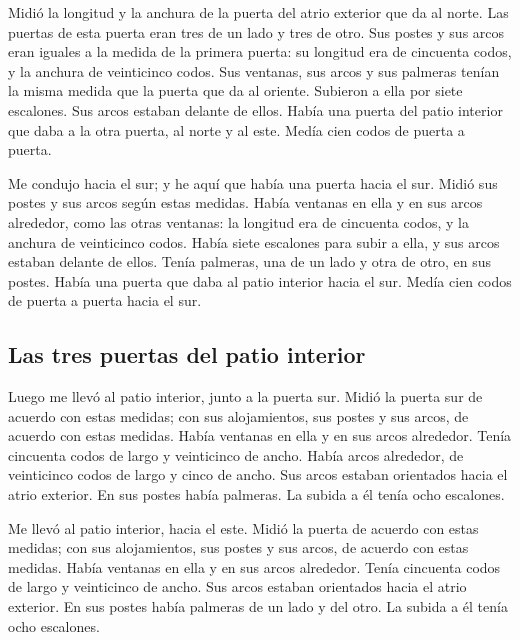  Midió la longitud y la anchura de la puerta del atrio
exterior que da al norte.  Las puertas de esta puerta
eran tres de un lado y tres de otro. Sus postes y sus arcos eran iguales
a la medida de la primera puerta: su longitud era de cincuenta codos, y
la anchura de veinticinco codos.  Sus ventanas, sus arcos
y sus palmeras tenían la misma medida que la puerta que da al oriente.
Subieron a ella por siete escalones. Sus arcos estaban delante de ellos.
 Había una puerta del patio interior que daba a la otra
puerta, al norte y al este. Medía cien codos de puerta a puerta.

 Me condujo hacia el sur; y he aquí que había una puerta
hacia el sur. Midió sus postes y sus arcos según estas medidas.
 Había ventanas en ella y en sus arcos alrededor, como
las otras ventanas: la longitud era de cincuenta codos, y la anchura de
veinticinco codos.  Había siete escalones para subir a
ella, y sus arcos estaban delante de ellos. Tenía palmeras, una de un
lado y otra de otro, en sus postes.  Había una puerta que
daba al patio interior hacia el sur. Medía cien codos de puerta a puerta
hacia el sur.

\hypertarget{las-tres-puertas-del-patio-interior}{%
\subsection{Las tres puertas del patio
interior}\label{las-tres-puertas-del-patio-interior}}

 Luego me llevó al patio interior, junto a la puerta sur.
Midió la puerta sur de acuerdo con estas medidas;  con
sus alojamientos, sus postes y sus arcos, de acuerdo con estas medidas.
Había ventanas en ella y en sus arcos alrededor. Tenía cincuenta codos
de largo y veinticinco de ancho.  Había arcos alrededor,
de veinticinco codos de largo y cinco de ancho.  Sus
arcos estaban orientados hacia el atrio exterior. En sus postes había
palmeras. La subida a él tenía ocho escalones.

 Me llevó al patio interior, hacia el este. Midió la
puerta de acuerdo con estas medidas;  con sus
alojamientos, sus postes y sus arcos, de acuerdo con estas medidas.
Había ventanas en ella y en sus arcos alrededor. Tenía cincuenta codos
de largo y veinticinco de ancho.  Sus arcos estaban
orientados hacia el atrio exterior. En sus postes había palmeras de un
lado y del otro. La subida a él tenía ocho escalones.

